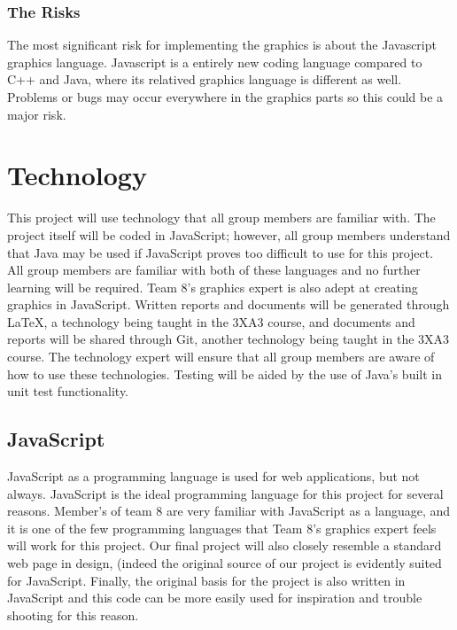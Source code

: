\documentclass{article}
\begin{document}
\subsubsection{The Risks}
The most significant risk for implementing the graphics is about the Javascript 
graphics language. Javascript is a entirely new coding language compared to C++ 
and Java, where its relatived graphics language is different as well. Problems 
or bugs may occur everywhere in the graphics parts so this could be a major 
risk.

\section{Technology}

This project will use technology that all group members are familiar with. The project itself will be coded in JavaScript; however,
all group members understand that Java may be used if JavaScript proves too 
difficult to use for this project. All group members are familiar with both of 
these languages and no further learning will be required. Team 8’s graphics 
expert is also adept at creating graphics in JavaScript. Written reports and 
documents will be generated through \LaTeX, a technology being taught in the 3XA3 
course, and documents and reports will be shared through Git, another technology 
being taught in the 3XA3 course. The technology expert will ensure that all 
group members are aware of how to use these technologies. Testing will be aided 
by the use of Java’s built in unit test functionality.

\subsection{JavaScript}

JavaScript as a programming language is used for web applications, 
but not always. JavaScript is the ideal programming language for this project 
for several reasons. Member's of team 8 are very familiar with JavaScript as a 
language, and it is one of the few programming languages that Team 8's graphics 
expert feels will work for this project. Our final project will also closely 
resemble a standard web page in design, (indeed the original source of our 
project is evidently suited for JavaScript. Finally, the original basis for the 
project is also written in JavaScript and this code can be more easily used for 
inspiration and trouble shooting for this reason.
\end{document}

